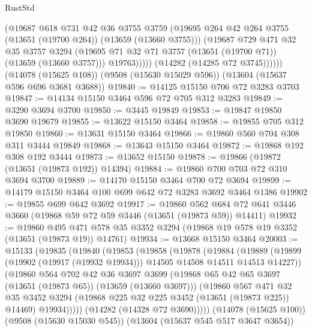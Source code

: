 \begin{lexlean}{RustStd}
\begin{coremodule}
                  (@19687
                    @618
                    @731
                    @42
                    @36
                    @3755
                    @3759
                    (@19695 @264 @42 @264 @3755 (@13651 (@19700 @264)) (@13659 (@13660 @3755)))
                    (@19687
                      @729
                      @471
                      @32
                      @35
                      @3757
                      @3294
                      (@19695 @71 @32 @71 @3757 (@13651 (@19700 @71)) (@13659 (@13660 @3757)))
                      @19763)))))
            (@14282 (@14285 @72 @3745))))))
    (@14078 (@15625 @108))
    (@9508 (@15630 @15029 @596))
    (@13604 (@15637 @596 @696 @3681 @3688))
@19840 := @14125 @15150 @706 @72 @3283 @3703
@19847 := @14134 @15150 @3464 @596 @72 @705 @312 @3283
@19849 := @3290 @3694 @3700
@19850 := @3445 @19849
@19853 := @19847 @19850 @3690 @19679
@19855 := @13622 @15150 @3464
@19858 := @19855 @705 @312 @19850
@19860 := @13631 @15150 @3464
@19866 := @19860 @560 @704 @308 @311 @3444 @19849
@19868 := @13643 @15150 @3464
@19872 := @19868 @192 @308 @192 @3444
@19873 := @13652 @15150
@19878 := @19866 (@19872 (@13651 (@19873 @192)) @14394)
@19884 := @19860 @700 @703 @72 @310 @3694 @3700
@19889 := @14170 @15150 @3464 @700 @72 @3694
@19899 := @14179 @15150 @3464 @100 @699 @642 @72 @3283 @3692 @3464 @1386
@19902 := @19855 @699 @642 @3692
@19917 := @19860
    @562
    @684
    @72
    @641
    @3446
    @3660
    (@19868 @59 @72 @59 @3446 (@13651 (@19873 @59)) @14411)
@19932 := @19860
    @495
    @471
    @578
    @35
    @3352
    @3294
    (@19868 @19 @578 @19 @3352 (@13651 (@19873 @19)) @14761)
@19934 := @13668 @15150 @3464
@20003 := @15133
    (@19835
      (@19840
        (@19853
          (@19858
            (@19878
              (@19884
                (@19889
                  (@19899 (@19902 (@19917 (@19932 @19934))) @14505 @14508 @14511 @14513 @14227))
                (@19860
                  @564
                  @702
                  @42
                  @36
                  @3697
                  @3699
                  (@19868 @65 @42 @65 @3697 (@13651 (@19873 @65)) (@13659 (@13660 @3697)))
                  (@19860
                    @567
                    @471
                    @32
                    @35
                    @3452
                    @3294
                    (@19868 @225 @32 @225 @3452 (@13651 (@19873 @225)) @14469)
                    @19934)))))
          (@14282 (@14328 @72 @3690)))))
    (@14078 (@15625 @100))
    (@9508 (@15630 @15030 @545))
    (@13604 (@15637 @545 @517 @3647 @3654))

\end{coremodule}
\end{lexlean}
